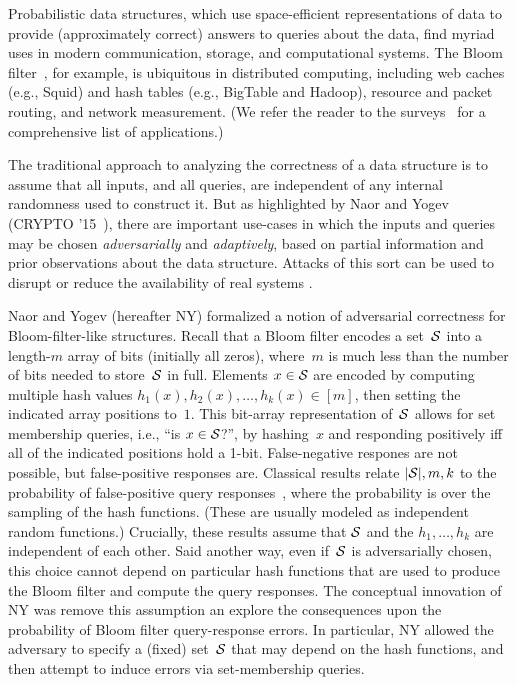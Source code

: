 Probabilistic data structures, which use space-efficient
representations of data to provide (approximately correct) answers to
queries about the data, find myriad uses in modern communication,
storage, and computational systems.  The Bloom
filter~\cite{bloom1970space}, for example, is
ubiquitous in distributed computing, including web caches (e.g., Squid) and hash
tables (e.g., BigTable and Hadoop), resource and packet routing, and network
measurement. (We refer the reader to the
surveys~\cite{broder2004network,tarkoma2012theory} for a comprehensive list of
applications.) 

The traditional approach to analyzing the correctness of a data structure is to
assume that all inputs, and all queries, are independent of any internal
randomness used to construct it.  But as highlighted by Naor and
Yogev (CRYPTO '15~\cite{naor2015bloom}), there are important use-cases in which the inputs
and queries may be chosen \emph{adversarially} and \emph{adaptively}, based on
partial information and prior observations about the data structure. Attacks of
this sort can be used to disrupt or reduce the availability of real systems
\cite{crosby2003denial,gerbet2015power,lipton1993clocked}.

Naor and Yogev (hereafter NY) formalized a notion of adversarial correctness for 
Bloom-filter-like structures.  Recall that a Bloom filter encodes a
set~$\mathcal{S}$ into a length-$m$ array of bits (initially all zeros), where~$m$ is much less than the
number of bits needed to store~$\mathcal{S}$ in full.  Elements $x \in \mathcal{S}$
are encoded by computing multiple hash values
$h_1(x),h_2(x),\ldots,h_k(x)\in [m]$, then setting the indicated array positions
to~$1$.  This bit-array representation of~$\mathcal{S}$ allows for
set membership queries, i.e., ``is $x\in\mathcal{S}$?'', 
by hashing~$x$ and responding positively iff all of the indicated
positions hold a 1-bit. 
False-negative respones are not possible, but false-positive responses
are.  Classical results relate $|\mathcal{S}|,m,k$ to the probability of false-positive query
responses~\cite{broder2004network,kirsch2006less}, where the
probability is over the sampling of the hash functions.  (These are
usually modeled as independent random functions.)  
Crucially, these results assume that $\mathcal{S}$ and the $h_1,\ldots,h_k$ are independent of
each other.  Said another way, even if~$\mathcal{S}$ is adversarially chosen,
this choice cannot depend on particular hash functions that are used
to produce the Bloom filter and compute the query responses.
%
The conceptual innovation of NY was remove this assumption an explore
the consequences upon the probability of Bloom filter query-response errors.  In
particular, NY allowed the adversary to specify a (fixed)
set~$\mathcal{S}$ that may depend on the hash functions, and then attempt to
induce errors via set-membership queries.

